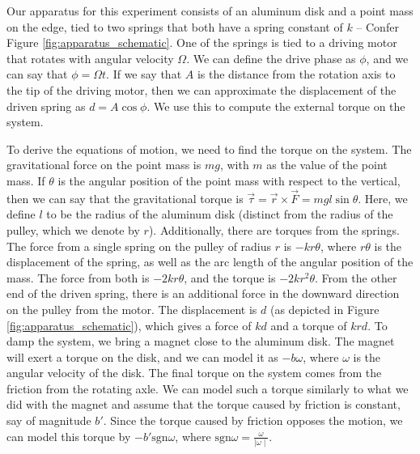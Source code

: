 \documentclass[twocolumn,amsmath,amssymb,pra, floatfix]{revtex4-2}
\begin{document}
Our apparatus for this experiment consists of an aluminum disk and a point mass on the edge, tied to two springs that both have a spring constant of $k$ -- Confer Figure \ref{fig:apparatus_schematic}. One of the springs is tied to a driving motor that rotates with angular velocity $\Omega$. We can define the drive phase as $\phi$, and we can say that $\phi = \Omega t$. If we say that $A$ is the distance from the rotation axis to the tip of the driving motor, then we can approximate the displacement of the driven spring as $d=A \cos\phi$. We use this to compute the external torque on the system.  

To derive the equations of motion, we need to find the torque on the system. The gravitational force on the point mass is $mg$, with $m$ as the value of the point mass. If $\theta$ is the angular position of the point mass with respect to the vertical, then we can say that the gravitational torque is $\vec{\tau} = \vec{r}\times\vec{F} = mgl \sin{\theta}$. Here, we define $l$ to be the radius of the aluminum disk (distinct from the radius of the pulley, which we denote by $r$). Additionally, there are torques from the springs. The force from a single spring on the pulley of radius $r$ is $-kr\theta$, where $r\theta$ is the displacement of the spring, as well as the arc length of the angular position of the mass. The force from both is $-2kr\theta$, and the torque is $-2kr^{2}\theta$. From the other end of the driven spring, there is an additional force in the downward direction on the pulley from the motor. The displacement is $d$ (as depicted in Figure \ref{fig:apparatus_schematic}), which gives a force of $kd$ and a torque of $krd$. To damp the system, we bring a magnet close to the aluminum disk.
The magnet will exert a torque on the disk, and we can model it as $-b\omega$, where $\omega$ is the angular velocity of the disk. The final torque on the system comes from the friction from the rotating axle. We can model such a torque similarly to what we did with the magnet and assume that the torque caused by friction is constant, say of magnitude $b'$. Since the torque caused by friction opposes the motion, we can model this torque by $-b' \mathrm{sgn}\omega$, where $ \mathrm{sgn}\omega = \frac{\omega}{\mid\omega\mid}$. 
\end{document}
